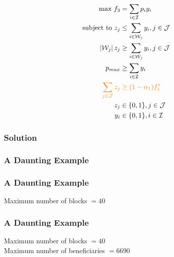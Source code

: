 \documentclass[10pt, compress]{beamer}
\begin{document}
\begin{frame}[fragile]
\begin{align*}
\textrm{max } f_3 &= \sum_{i \in \mathcal{I}} p_iy_i \\
\textrm{subject to } z_j &\leq \sum_{i \in \mathcal{W}_j} y_i, j \in \mathcal{J}\\
\left|\mathcal{W}_j\right|z_j &\geq \sum_{i \in \mathcal{W}_j} y_i, j \in \mathcal{J} \\
p_{max} &\geq \sum_{i \in \mathcal{I}} y_i  \\
\color{orange} \sum_{j \in \mathcal{J}} z_j & \color{orange} \geq (1-\alpha_1)f_1^*\\
z_j &\in \{0,1\}, j \in \mathcal{J} \\
y_i &\in \{0,1\}, i \in \mathcal{I}
\end{align*}
\end{frame}

\begin{frame}[fragile]
\frametitle{Solution}
\begin{center}
\end{center}
\end{frame}

\begin{frame}[fragile]
\frametitle{A Daunting Example}
\begin{center}
\end{center}
\end{frame}

\begin{frame}[fragile]
\frametitle{A Daunting Example}
\begin{center}
\end{center}
\small \alert{Maximum number of blocks $= 40$}
\end{frame}

\begin{frame}[fragile]
\frametitle{A Daunting Example}
\begin{center}
\end{center}
\small Maximum number of blocks $= 40$ \\
\alert{Maximum number of beneficiaries $ = 6690$}
\end{frame}
\end{document}
